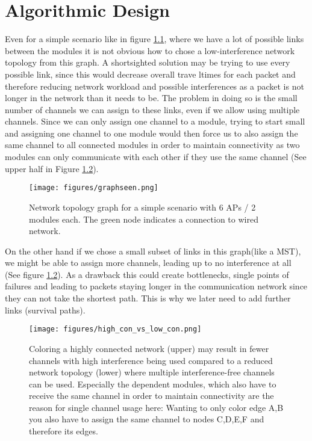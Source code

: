 \chapter{Algorithmic Design}
  Even for a simple scenario like in figure \ref{fig:graphseen}, where we have a lot of possible links between the modules it is not obvious how to
  chose a low-interference network topology from this graph.
  A shortsighted solution may be trying to use every possible link, since this would decrease overall trave ltimes for each packet and therefore
  reducing network workload and possible interferences as a packet is not longer in the network than it needs to be. 
  The problem in doing so is the small number of channels we can assign to these links, even if we allow using multiple channels.
  Since we can only assign one channel to a module, trying to start small and assigning one channel to one module would then force us to also 
  assign the same channel to all connected modules in order to maintain connectivity as two modules can only communicate with each other if they use the same channel
  (See upper half in Figure \ref{fig:high_con_vs_low_con}). 
  
  \begin{figure}[h!]
    \centering
    \texttt{[image: figures/graphseen.png]}
    \caption{Network topology graph for a simple scenario with 6 APs / 2 modules each. The green node indicates a connection to wired network.}
    \label{fig:graphseen}
  \end{figure}

  On the other hand if we chose a small subset of links in this graph(like a \ac{MST}), we might be able to 
  assign more channels, leading up to no interference at all (See figure \ref{fig:high_con_vs_low_con}).
  As a drawback this could create bottlenecks, single points of failures and leading to packets staying longer in the 
  communication network since they can not take the shortest path. This is why we later need to add further links (survival paths).

  \begin{figure}[h!]
    \centering
    \texttt{[image: figures/high\_con\_vs\_low\_con.png]}
    \caption{Coloring a highly connected network (upper) may result in fewer channels with high interference being used compared to 
      a reduced network topology (lower) where multiple interference-free channels can be used. Especially the dependent modules, which also have to receive the same channel
      in order to maintain connectivity are the reason for single channel usage here: Wanting to only color edge A,B you also have to assign the same channel to nodes C,D,E,F
      and therefore its edges.}
    \label{fig:high_con_vs_low_con}
  \end{figure}
  

